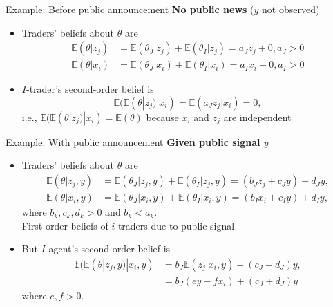 \documentclass[english,10pt
,aspectratio=169
]{beamer}
\begin{document}
\begin{frame}{Example: Before public announcement}
	\textbf{No public news} ($y$ not observed)
	\begin{itemize}
		\item Traders' beliefs about $\theta$ are
		\begin{align*}
			\mathbb{E}(\theta|z_j) & =\mathbb{E}(\theta_{J}|z_j)+\mathbb{E}(\theta_{I}|z_j)=a_J z_j+0, a_J>0 \\
			\mathbb{E}(\theta|x_i) &=\mathbb{E}(\theta_{J}|x_i)+\mathbb{E}(\theta_{I}|x_i)=a_I x_i+0, a_I>0
		\end{align*}
		\item $I$-trader's second-order belief is
		\[
		\mathbb{E}(\mathbb{E}(\theta|z_j)|x_i)=\mathbb{E}(a_J z_j | x_i) = 0,
		\]
		i.e., $\mathbb{E}(\mathbb{E}(\theta|z_j)|x_i) = \mathbb{E}(\theta)$ because $x_i$ and $z_j$ are independent
	\end{itemize}
\end{frame}


\begin{frame}{Example: With public announcement}
	\textbf{Given public signal $y$}
	\begin{itemize}
		\item Traders' beliefs about $\theta$ are
		\begin{align*}
			\mathbb{E}(\theta|z_j, y) & =\mathbb{E}(\theta_{J}|z_j,y)+\mathbb{E}(\theta_{I}|z_j,y)=(b_J z_j+c_Jy)+d_J y,  \\
			\mathbb{E}(\theta|x_i, y) & =\mathbb{E}(\theta_{J}|x_i,y)+\mathbb{E}(\theta_{I}|x_i,y)=(b_I x_i+c_I y)+d_I y,
		\end{align*}
		where $b_k,c_k,d_k>0$ and $b_k<a_k$. \\
		First-order beliefs of $i$-traders  due to public signal
		\pause
		\item But $I$-agent's second-order belief  is
		\begin{align*}
			\mathbb{E}(\mathbb{E}(\theta|z_j,y)|x_i,y)
			&=b_J\mathbb{E}(z_j|x_i,y)+(c_J+d_J)y, \\
			&=b_J(ey-fx_i)+(c_J+d_J)y 
		\end{align*}
		where $e,f>0$. 
		
	\end{itemize}
\end{frame}
\end{document}
